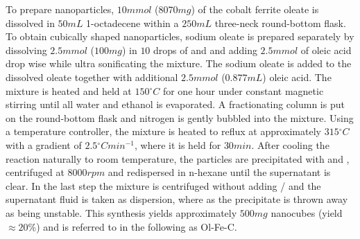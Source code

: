 \documentclass[\main/dresen_thesis.tex]{subfiles}
\begin{document}
    To prepare nanoparticles, $10 \unit{mmol}$ ($8070 \unit{mg}$) of the cobalt ferrite oleate is dissolved in $50 \unit{mL}$ 1-octadecene within a $250 \unit{mL}$ three-neck round-bottom flask.
    To obtain cubically shaped nanoparticles, sodium oleate is prepared separately by dissolving $2.5 \unit{mmol}$ ($100 \unit{mg}$)  in $10$ drops of  and  and adding $2.5 \unit{mmol}$ of oleic acid drop wise while ultra sonificating the mixture.
    The sodium oleate is added to the dissolved oleate together with additional $2.5 \unit{mmol}$ ($0.877 \unit{mL}$) oleic acid.
    The mixture is heated and held at $150 \unit{^\circ C}$ for one hour under constant magnetic stirring until all water and ethanol is evaporated.
    A fractionating column is put on the round-bottom flask and nitrogen is gently bubbled into the mixture.
    Using a temperature controller, the mixture is heated to reflux at approximately $315 \unit{^\circ C}$ with a gradient of $2.5 \unit{^\circ C min^{-1}}$, where it is held for $30 \unit{min}$.
    After cooling the reaction naturally to room temperature, the particles are precipitated with  and , centrifuged at $8000 \unit{rpm}$ and redispersed in n-hexane until the supernatant is clear.
    In the last step the mixture is centrifuged without adding / and the supernatant fluid is taken as dispersion, where as the precipitate is thrown away as being unstable.
    This synthesis yields approximately $500 \unit{mg}$ nanocubes (yield $\approx 20 \%$) and is referred to in the following as Ol-Fe-C.
\end{document}
